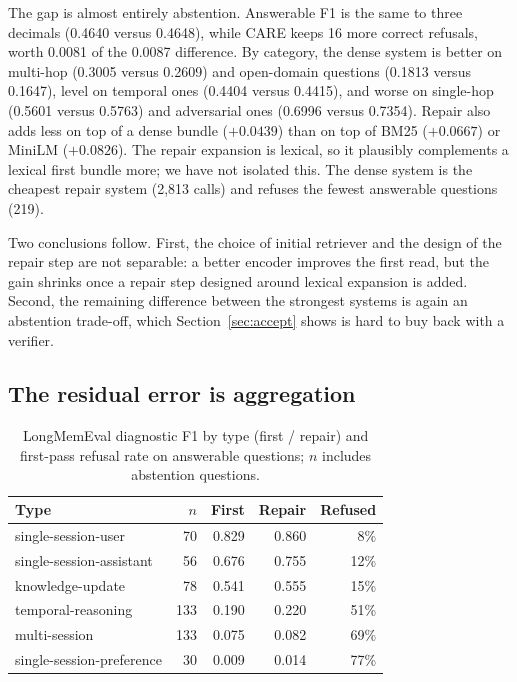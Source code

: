 \documentclass[10pt]{article}
\theoremstyle{plain}
\theoremstyle{definition}
\theoremstyle{remark}
\newcommand{\care}{\textsc{CARE}}
\begin{document}
The gap is almost entirely abstention. Answerable F1 is the same to three decimals
(0.4640 versus 0.4648), while \care{} keeps 16 more correct refusals, worth 0.0081 of
the 0.0087 difference. By category, the dense system is better on multi-hop
(0.3005 versus 0.2609) and open-domain questions (0.1813 versus 0.1647), level on
temporal ones (0.4404 versus 0.4415), and worse on single-hop (0.5601 versus 0.5763)
and adversarial ones (0.6996 versus 0.7354). Repair also adds less on top of a dense
bundle ($+0.0439$) than on top of BM25 ($+0.0667$) or MiniLM ($+0.0826$). The repair
expansion is lexical, so it plausibly complements a lexical first bundle more; we have
not isolated this. The dense system is the cheapest repair system (2,813 calls) and
refuses the fewest answerable questions (219).

Two conclusions follow. First, the choice of initial retriever and the design of the
repair step are not separable: a better encoder improves the first read, but the gain
shrinks once a repair step designed around lexical expansion is added. Second, the
remaining difference between the strongest systems is again an abstention trade-off,
which Section~\ref{sec:accept} shows is hard to buy back with a verifier.

\subsection{The residual error is aggregation}

\begin{table}[t]
\centering
\caption{LongMemEval diagnostic F1 by type (first / repair) and first-pass refusal
rate on answerable questions; $n$ includes abstention questions.}
\label{tab:lme}
\small
\begin{tabular}{lrrrr}
\toprule
Type & $n$ & First & Repair & Refused \\
\midrule
single-session-user & 70 & 0.829 & 0.860 & 8\% \\
single-session-assistant & 56 & 0.676 & 0.755 & 12\% \\
knowledge-update & 78 & 0.541 & 0.555 & 15\% \\
temporal-reasoning & 133 & 0.190 & 0.220 & 51\% \\
multi-session & 133 & 0.075 & 0.082 & 69\% \\
single-session-preference & 30 & 0.009 & 0.014 & 77\% \\
\bottomrule
\end{tabular}
\end{table}
\end{document}
